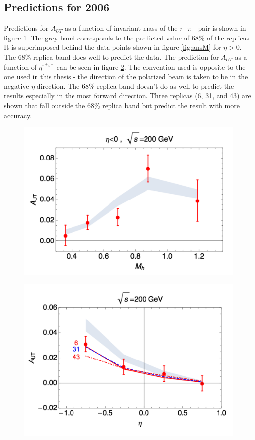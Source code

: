 \documentclass[abstract = on,listof=totoc, bibliography=totoc]{scrreprt}
\newcommand{\etapair}{\eta^{\pi^+\pi^-}}
\newcommand{\pip}{\pi^+}
\newcommand{\pim}{\pi^-}
\newcommand{\pair}{$\pip\pim$ }
\begin{document}
\subsection{Predictions for 2006}

Predictions for $A_{UT}$ as a function of invariant mass of the \pair pair is shown in figure \ref{fig:2006PredM}. The grey band corresponds to the predicted value of 68\% of the replicas. It is superimposed behind the data points shown in figure \ref{fig:ansM} for $\eta > 0$. The 68\% replica band does well to predict the data. The prediction for $A_{UT}$ as a function of $\etapair$ can be seen in figure \ref{fig:2006PredEta}. The convention used is opposite to the one used in this thesis - the direction of the polarized beam is taken to be in the negative $\eta$ direction. The 68\% replica band doesn't do as well to predict the results especially in the most forward direction. Three replicas (6, 31, and 43) are shown that fall outside the 68\% replica band but predict the result with more accuracy.  

\begin{figure}
\begin{center}
\includegraphics[width = .6\textwidth]{2006PredM}
\caption[]{}
\label{fig:2006PredM}
\end{center}
\end{figure}

\begin{figure}
\begin{center}
\includegraphics[width = .6\textwidth]{2006PredEta}
\caption[]{}
\label{fig:2006PredEta}
\end{center}
\end{figure}
\end{document}
